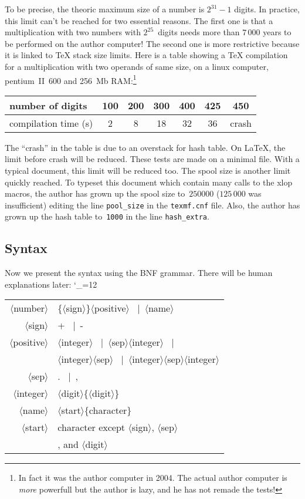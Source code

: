 \documentclass[12pt]{report}
\makeatletter
\newenvironment{syntaxBNF}{%
  \catcode`\_=12
  \def\*##1*{$\langle$##1$\rangle$}%
  \def\alt{\unskip~$|$~\ignorespaces}%
  \def\sameline{\multicolumn{1}{c}{} & \null\quad}%
  \ttfamily
  \begin{center}\begin{tabular}{r@{\quad:=\quad}l}}
{\end{tabular}\end{center}}
\newcommand\package[1]{\textsf{#1}}
\newcommand\file[1]{\texttt{#1}}
\makeatother
\begin{document}
To be precise, the theoric maximum size of a number
is $2^{31}-1$ digits. In practice, this limit
can't be reached for two essential reasons. The first one is that a
multiplication with two numbers with $2^{25}$~digits needs more than
$7\,000$ years to be performed on the author computer! The second one
is more restrictive because it is linked to \TeX{} stack size limits.
Here is a table showing a \TeX{} compilation for a multiplication with
two operands of same size, on a linux computer, pentium~II~600 and
256~Mb RAM:\footnote{In fact it was the author computer in 2004. The
  actual author computer is \emph{more} powerfull but the author is
  lazy, and he has not remade the tests!}
\begin{center}
  \begin{tabular}{|l|*{6}{c|}}
    \hline
    number of digits & 100 & 200 & 300 & 400 & 425 & 450 \\\hline
    compilation time (s) & 2 & 8 & 18 & 32 & 36 & crash \\\hline
  \end{tabular}
\end{center}
The ``crash'' in the table is due to an overstack for hash table.
%
%
On \LaTeX{}, the limit before crash will be reduced. These tests are
made on a minimal file. With a typical document, this limit will be
reduced too. The spool size is another limit quickly reached.
%
To typeset this document which contain many calls to the
\package{xlop} macros, the author has grown up the spool size
to~$250000$ ($125\,000$ was insufficient) editing the line
\verb+pool_size+ in the \file{texmf.cnf} file. Also, the author has
grown up the hash table to~\texttt{1000} in the line
\verb+hash_extra+.

\subsection{Syntax}
\label{subsec:Syntaxe}
Now we present the syntax using the BNF grammar. There will be human
explanations later:
\begin{syntaxBNF}
  \*number* & \{\*sign*\}\*positive* \alt \*name* \\
  \*sign* & + \alt - \\
  \*positive* & \*integer* \alt \*sep*\*integer* \alt \\
  \sameline \*integer*\*sep* \alt \*integer*\*sep*\*integer* \\
  \*sep* & . \alt , \\
  \*integer* & \*digit*\{\*digit*\} \\
  \*name* & \*start*\{character\} \\
  \*start* & character \textnormal{except } \*sign*\textnormal{,}
  \*sep* \\
  \sameline \textnormal{, and } \*digit*
\end{syntaxBNF}
\end{document}

